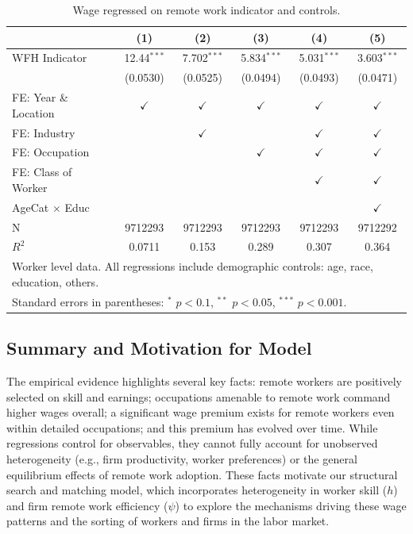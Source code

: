 \documentclass[
  11pt,
  letterpaper,
  DIV=11,
  numbers=noendperiod]{scrartcl}
\newcommand{\sym}[1]{\ensuremath{^{#1}}}
\theoremstyle{plain}
\theoremstyle{remark}
\begin{document}
\begin{table}[htbp]

\centering
\footnotesize
\caption{Wage regressed on remote work indicator and controls. }
\begin{tabular}{l c c c c c}
\hline\hline
& \multicolumn{1}{c}{(1)} & \multicolumn{1}{c}{(2)} & \multicolumn{1}{c}{(3)} & \multicolumn{1}{c}{(4)} & \multicolumn{1}{c}{(5)} \\
\hline
WFH Indicator & 12.44\sym{***}& 7.702\sym{***}& 5.834\sym{***}& 5.031\sym{***}& 3.603\sym{***}\\
& (0.0530) & (0.0525) & (0.0494) & (0.0493) & (0.0471) \\
\hline
FE: Year \& Location & $\checkmark$ & $\checkmark$ & $\checkmark$ & $\checkmark$ & $\checkmark$ \\
FE: Industry & & $\checkmark$ & & $\checkmark$ & $\checkmark$ \\
FE: Occupation & & & $\checkmark$ & $\checkmark$ & $\checkmark$ \\
FE: Class of Worker & & & & $\checkmark$ & $\checkmark$ \\
AgeCat $\times$ Educ & & & & & $\checkmark$ \\
\hline
N & 9712293 & 9712293 & 9712293 & 9712293 & 9712292 \\
$R^2$ & 0.0711 & 0.153 & 0.289 & 0.307 & 0.364 \\
\hline\hline
\multicolumn{6}{l}{\footnotesize Worker level data. All regressions include demographic controls: age, race, education, others.}\\
\multicolumn{6}{l}{\footnotesize Standard errors in parentheses: \sym{*} \(p<0.1\), \sym{**} \(p<0.05\), \sym{***} \(p<0.001\).}\\
\end{tabular}
\end{table}

\subsection{Summary and Motivation for
Model}\label{summary-and-motivation-for-model}

The empirical evidence highlights several key facts: remote workers are
positively selected on skill and earnings; occupations amenable to
remote work command higher wages overall; a significant wage premium
exists for remote workers even within detailed occupations; and this
premium has evolved over time. While regressions control for
observables, they cannot fully account for unobserved heterogeneity
(e.g., firm productivity, worker preferences) or the general equilibrium
effects of remote work adoption. These facts motivate our structural
search and matching model, which incorporates heterogeneity in worker
skill (\(h\)) and firm remote work efficiency (\(\psi\)) to explore the
mechanisms driving these wage patterns and the sorting of workers and
firms in the labor market.
\end{document}
